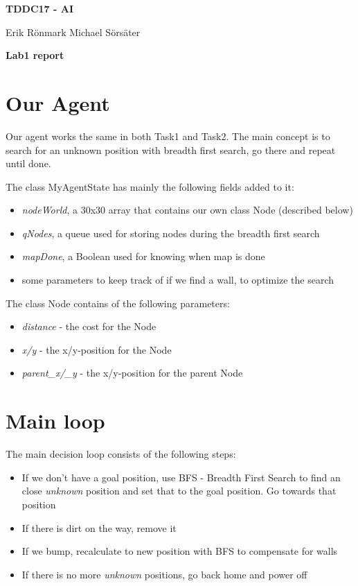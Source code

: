 \documentclass[12pt,a4paper]{article}
\begin{document}
\begin{center}
    \Huge
    \textbf{TDDC17 - AI}

    \vspace{0.3cm}
    \Large
    Erik Rönmark
    Michael Sörsäter
    
    \vspace{0.7cm}
    \textbf{Lab1 report}
\end{center}

\section{Our Agent}
Our agent works the same in both Task1 and Task2.
The main concept is to search for an unknown position with breadth first search, go there and repeat until done.

The class MyAgentState has mainly the following fields added to it:
\begin{itemize}
	\item \textit{nodeWorld}, a 30x30 array that contains our own class Node (described below)
	\item \textit{qNodes}, a queue used for storing nodes during the breadth first search
	\item \textit{mapDone}, a Boolean used for knowing when map is done
	\item some parameters to keep track of if we find a wall, to optimize the search
\end{itemize}

The class Node contains of the following parameters:
\begin{itemize}
	\item \textit{distance} - the cost for the Node
	\item \textit{x/y} - the x/y-position for the Node
	\item \textit{parent\_x/\_y} - the x/y-position for the parent Node
\end{itemize}

\section{Main loop}
The main decision loop consists of the following steps:
\begin{itemize}
	\item If we don't have a goal position, use BFS - Breadth First Search to find an close \textit{unknown} position and set that to the goal position. Go towards that position
	\item If there is dirt on the way, remove it
	\item If we bump, recalculate to new position with BFS to compensate for walls
	\item If there is no more \textit{unknown} positions, go back home and power off
\end{itemize}
\end{document}
